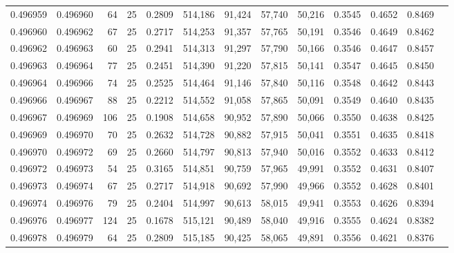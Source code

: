 \begin{tabular}{rrrrrrrrrrrrr}
0.496959 & 0.496960 &    64 &  25 &                                     0.2809 & 514,186 &  91,424 &  57,740 &  50,216 & 0.3545 & 0.4652 & 0.8469 \\
0.496960 & 0.496962 &    67 &  25 &                                     0.2717 & 514,253 &  91,357 &  57,765 &  50,191 & 0.3546 & 0.4649 & 0.8462 \\
0.496962 & 0.496963 &    60 &  25 &                                     0.2941 & 514,313 &  91,297 &  57,790 &  50,166 & 0.3546 & 0.4647 & 0.8457 \\
0.496963 & 0.496964 &    77 &  25 &                                     0.2451 & 514,390 &  91,220 &  57,815 &  50,141 & 0.3547 & 0.4645 & 0.8450 \\
0.496964 & 0.496966 &    74 &  25 &                                     0.2525 & 514,464 &  91,146 &  57,840 &  50,116 & 0.3548 & 0.4642 & 0.8443 \\
0.496966 & 0.496967 &    88 &  25 &                                     0.2212 & 514,552 &  91,058 &  57,865 &  50,091 & 0.3549 & 0.4640 & 0.8435 \\
0.496967 & 0.496969 &   106 &  25 &                                     0.1908 & 514,658 &  90,952 &  57,890 &  50,066 & 0.3550 & 0.4638 & 0.8425 \\
0.496969 & 0.496970 &    70 &  25 &                                     0.2632 & 514,728 &  90,882 &  57,915 &  50,041 & 0.3551 & 0.4635 & 0.8418 \\
0.496970 & 0.496972 &    69 &  25 &                                     0.2660 & 514,797 &  90,813 &  57,940 &  50,016 & 0.3552 & 0.4633 & 0.8412 \\
0.496972 & 0.496973 &    54 &  25 &                                     0.3165 & 514,851 &  90,759 &  57,965 &  49,991 & 0.3552 & 0.4631 & 0.8407 \\
0.496973 & 0.496974 &    67 &  25 &                                     0.2717 & 514,918 &  90,692 &  57,990 &  49,966 & 0.3552 & 0.4628 & 0.8401 \\
0.496974 & 0.496976 &    79 &  25 &                                     0.2404 & 514,997 &  90,613 &  58,015 &  49,941 & 0.3553 & 0.4626 & 0.8394 \\
0.496976 & 0.496977 &   124 &  25 &                                     0.1678 & 515,121 &  90,489 &  58,040 &  49,916 & 0.3555 & 0.4624 & 0.8382 \\
0.496978 & 0.496979 &    64 &  25 &                                     0.2809 & 515,185 &  90,425 &  58,065 &  49,891 & 0.3556 & 0.4621 & 0.8376 \\

\end{tabular}
